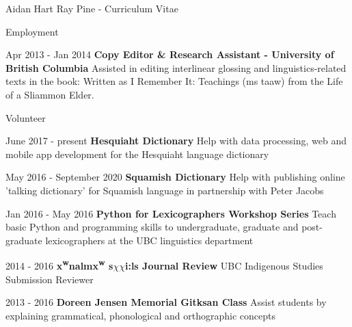 \documentclass[12pt]{letter}
\begin{document}
\begin{cv}{ Aidan Hart Ray Pine  \space - \space   Curriculum Vitae}
\begin{cvlist}{Employment}
                            \item[Apr 2013 -  Jan 2014 ] \textbf{Copy Editor \& Research Assistant - University of British Columbia}
                \newline Assisted in editing interlinear glossing and linguistics-related texts in the book: Written as I Remember It: Teachings ({\textglotstop}{\textschwa}ms ta{\textglotstop}aw) from the Life of a Sliammon Elder.
                    \end{cvlist}
        
        \begin{cvlist}{Volunteer}
                            \item[June 2017 - present] \textbf{Hesquiaht Dictionary}
                \newline Help with data processing, web and mobile app development for the Hesquiaht language dictionary
                            \item[May 2016 - September 2020] \textbf{Squamish Dictionary}
                \newline Help with publishing online 'talking dictionary' for Squamish language in partnership with Peter Jacobs
                            \item[Jan 2016 - May 2016] \textbf{Python for Lexicographers Workshop Series}
                \newline Teach basic Python and programming skills to undergraduate, graduate and post-graduate lexicographers at the UBC linguistics department
                            \item[2014 - 2016] \textbf{x{\textsuperscript{w}}na{\textglotstop}{\textschwa}l{\textschwa}mx{\textsuperscript{w}} s{\ensuremath{\chi}}{\textschwa}{\ensuremath{\chi}}i:ls Journal Review}
                \newline UBC Indigenous Studies Submission Reviewer
                            \item[2013 - 2016] \textbf{Doreen Jensen Memorial Gitksan Class}
                \newline Assist students by explaining grammatical, phonological and orthographic concepts
                    \end{cvlist}


\end{cv}
\end{document}
